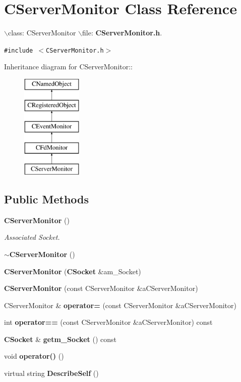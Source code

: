 \section{CServer\-Monitor  Class Reference}
\label{classCServerMonitor}
$\backslash$class: CServer\-Monitor $\backslash$file: {\bf CServer\-Monitor.h}. 


{\tt \#include $<$CServer\-Monitor.h$>$}

Inheritance diagram for CServer\-Monitor::\begin{figure}[H]
\begin{center}
\leavevmode
\includegraphics[height=5cm]{classCServerMonitor}
\end{center}
\end{figure}
\subsection*{Public Methods}
\begin{CompactItemize}
\item 
{\bf CServer\-Monitor} ()
\begin{CompactList}\small\item\em Associated Socket.\item\end{CompactList}\item 
{\bf $\sim$CServer\-Monitor} ()
\item 
{\bf CServer\-Monitor} ({\bf CSocket} \&am\_\-Socket)
\item 
{\bf CServer\-Monitor} (const CServer\-Monitor \&a\-CServer\-Monitor)
\item 
CServer\-Monitor \& {\bf operator=} (const CServer\-Monitor \&a\-CServer\-Monitor)
\item 
int {\bf operator==} (const CServer\-Monitor \&a\-CServer\-Monitor) const
\item 
{\bf CSocket} \& {\bf getm\_\-Socket} () const
\item 
void {\bf operator()} ()
\item 
virtual string {\bf Describe\-Self} ()
\end{CompactItemize}
